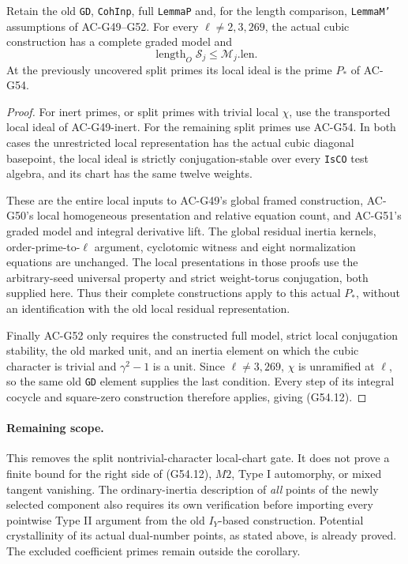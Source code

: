 \begin{corollary}
\label{AC-G54-model}
Retain the old \texttt{GD}, \texttt{CohInp}, full
\texttt{LemmaP} and, for the length comparison,
\texttt{LemmaM'} assumptions of AC-G49--G52.
For every $\ell\ne2,3,269$, the actual cubic construction
has a complete graded model and
\[
                  \operatorname{length}_O\mathcal S_j
                                \le\mathcal M_j.\mathrm{len}.
                                                               \tag{G54.12}
\]
At the previously uncovered split primes its local ideal
is the prime $P_*$ of AC-G54.
\end{corollary}
\begin{proof}
For inert primes, or split primes with trivial local
$\chi$, use the transported local ideal of AC-G49-inert.
For the remaining split primes use AC-G54.
In both cases the unrestricted local representation
has the actual cubic diagonal basepoint, the local
ideal is strictly conjugation-stable over every
\texttt{IsCO} test algebra, and its chart has the same
twelve weights.

These are the entire local inputs to AC-G49's global
framed construction, AC-G50's local homogeneous
presentation and relative equation count, and AC-G51's
graded model and integral derivative lift.  The global
residual inertia kernels, order-prime-to-$\ell$ argument,
cyclotomic witness and eight normalization equations
are unchanged.  The local presentations in those proofs
use the arbitrary-seed universal property and strict
weight-torus conjugation, both supplied here.
Thus their complete constructions apply to this
actual $P_*$, without an identification with the old
local residual representation.

Finally AC-G52 only requires the constructed full model,
strict local conjugation stability, the old marked unit,
and an inertia element on which the cubic character is
trivial and $\gamma^2-1$ is a unit.  Since
$\ell\ne3,269$, $\chi$ is unramified at $\ell$, so the
same old \texttt{GD} element supplies the last condition.
Every step of its integral cocycle and square-zero
construction therefore applies, giving (G54.12).
\end{proof}

\paragraph{Remaining scope.}
This removes the split nontrivial-character local-chart
gate.  It does not prove a finite bound for the right
side of (G54.12), $M2$, Type I automorphy, or mixed
tangent vanishing.  The ordinary-inertia description
of \emph{all} points of the newly selected component
also requires its own verification before importing
every pointwise Type II argument from the old
$I_Y$-based construction.  Potential crystallinity
of its actual dual-number points, as stated above,
is already proved.  The excluded coefficient primes
remain outside the corollary.

